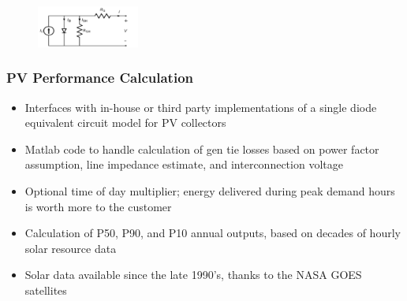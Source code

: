 \documentclass[aspectratio=169]{beamer}
\begin{document}
\begin{frame}
  \begin{figure}
    \includegraphics[width=0.3\textwidth]{Single_Diode_Model.png}
  \end{figure}
  \frametitle{PV Performance Calculation}
  \begin{itemize}
  \item Interfaces with in-house or third party implementations of a single
    diode equivalent circuit model for PV collectors
  \item Matlab code to handle calculation of gen tie losses based on
    power factor assumption, line impedance estimate, and
    interconnection voltage
  \item Optional time of day multiplier; energy delivered during peak
    demand hours is worth more to the customer
  \item Calculation of P50, P90, and P10 annual outputs, based on
    decades of hourly solar resource data
  \item Solar data available since the late 1990's,
    thanks to the NASA GOES satellites
  \end{itemize}
\end{frame}
\end{document}
